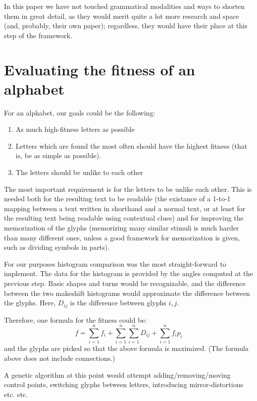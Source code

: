 \documentclass[conference]{IEEEtran}
\begin{document}
In this paper we have not touched grammatical modalities and ways to shorten them in great detail, as they would merit quite a lot more research and space (and, probably, their own paper); regardless, they would have their place at this step of the framework. 
\section{Evaluating the fitness of an alphabet}
For an alphabet, our goals could be the following:
\begin{enumerate}
        \item As much high-fitness letters as possible
        \item Letters which are found the most often should have the highest fitness (that is, be as simple as possible).
        \item The letters should be unlike to each other
\end{enumerate}

The most important requirement is for the letters to be unlike each other. This is needed both for the resulting text to be readable (the existance of a 1-to-1 mapping between a text written in shorthand and a normal text, or at least for the resulting text being readable using contextual clues) and for improving the memorization of the glyphs (memorizing many similar stimuli is much harder than many different ones, unless a good framework for memorization is given, such as dividing symbols in parts). 

For our purposes histogram comparison was the most straight-forward to implement. The data for the histogram is provided by the angles computed at the previous step. Basic shapes and turns would be recognizable, and the difference between the two makeshift histograms would approximate the difference between the glyphs. Here, \(D_{ij}\) is the difference between glyphs \(i, j\).

Therefore, one formula for the fitness could be:
\[
f=\sum^{n}_{i=1}f_i+
\sum^{n}_{i=1}\sum^{n}_{i=1}D_{ij}+
\sum^{n}_{i=1}f_ip_i
\]
and the glyphs are picked so that the above formula is maximized. (The formula above does not include connections.)

A genetic algorithm at this point would attempt adding/removing/moving control points, switching glyphs between letters, introducing mirror-distortions etc. etc.
\end{document}
